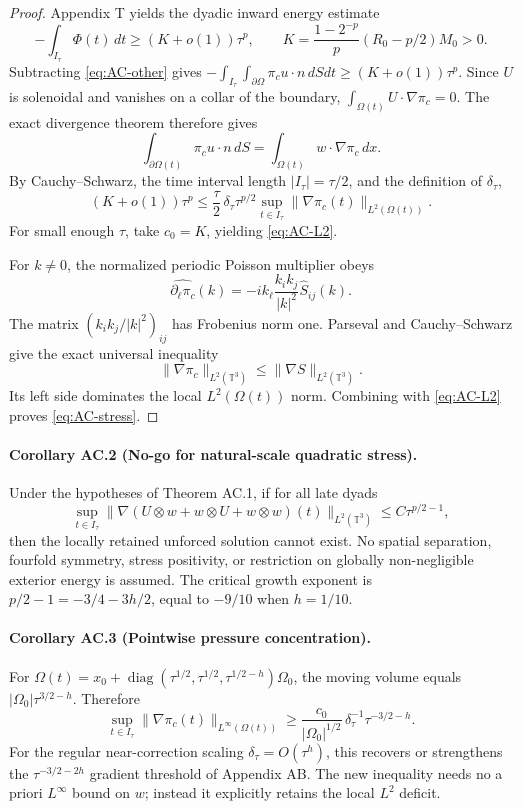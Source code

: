\begin{proof}
Appendix T yields the dyadic inward energy estimate
\[
-\int_{I_\tau}\Phi(t)\,dt\ge(K+o(1))\tau^p,\qquad
K=\frac{1-2^{-p}}p(R_0-p/2)M_0>0.
\]
Subtracting \eqref{eq:AC-other} gives
$-\int_{I_\tau}\int_{\partial\Omega}\pi_c u\cdot n\,dSdt
\ge (K+o(1))\tau^p$. Since $U$ is solenoidal and vanishes on a
collar of the boundary, $\int_{\Omega(t)}U\cdot\nabla\pi_c=0$.
The exact divergence theorem therefore gives
\[
\int_{\partial\Omega(t)}\pi_c u\cdot n\,dS
=\int_{\Omega(t)}w\cdot\nabla\pi_c\,dx.
\]
By Cauchy--Schwarz, the time interval length $|I_\tau|=\tau/2$,
and the definition of $\delta_\tau$,
\[
 (K+o(1))\tau^p
 \le\frac\tau2\,\delta_\tau\tau^{p/2}
 \sup_{t\in I_\tau}\|\nabla\pi_c(t)\|_{L^2(\Omega(t))}.
\]
For small enough $\tau$, take $c_0=K$, yielding \eqref{eq:AC-L2}.

For $k\ne0$, the normalized periodic Poisson multiplier obeys
\[
 \widehat{\partial_\ell\pi_c}(k)
 =-ik_\ell\frac{k_i k_j}{|k|^2}\widehat S_{ij}(k).
\]
The matrix $(k_i k_j/|k|^2)_{ij}$ has Frobenius norm one.
Parseval and Cauchy--Schwarz give the exact universal inequality
\[
 \|\nabla\pi_c\|_{L^2(\mathbb T^3)}
 \le\|\nabla S\|_{L^2(\mathbb T^3)}.
\]
Its left side dominates the local $L^2(\Omega(t))$ norm.
Combining with \eqref{eq:AC-L2} proves \eqref{eq:AC-stress}.
\end{proof}

\paragraph{Corollary AC.2 (No-go for natural-scale quadratic stress).}
Under the hypotheses of Theorem AC.1, if for all late dyads
\[
\sup_{t\in I_\tau}
\|\nabla(U\otimes w+w\otimes U+w\otimes w)(t)\|_{L^2(\mathbb T^3)}
\le C\tau^{p/2-1},
\]
then the locally retained unforced solution cannot exist. No
spatial separation, fourfold symmetry, stress positivity, or
restriction on globally non-negligible exterior energy is assumed.
The critical growth exponent is $p/2-1=-3/4-3h/2$, equal to $-9/10$
when $h=1/10$.

\paragraph{Corollary AC.3 (Pointwise pressure concentration).}
For $\Omega(t)=x_0+\operatorname{diag}(\tau^{1/2},
\tau^{1/2},\tau^{1/2-h})\Omega_0$, the moving volume equals
$|\Omega_0|\tau^{3/2-h}$. Therefore
\begin{equation}\label{eq:AC-Linfty}
\boxed{\sup_{t\in I_\tau}\|\nabla\pi_c(t)\|_{L^\infty(\Omega(t))}
\ge\frac{c_0}{|\Omega_0|^{1/2}}\,
\delta_\tau^{-1}\tau^{-3/2-h}.}
\end{equation}
For the regular near-correction scaling $\delta_\tau=O(\tau^h)$,
this recovers or strengthens the $\tau^{-3/2-2h}$
gradient threshold of Appendix AB. The new inequality needs no
a priori $L^\infty$ bound on $w$; instead it explicitly retains the
local $L^2$ deficit.

